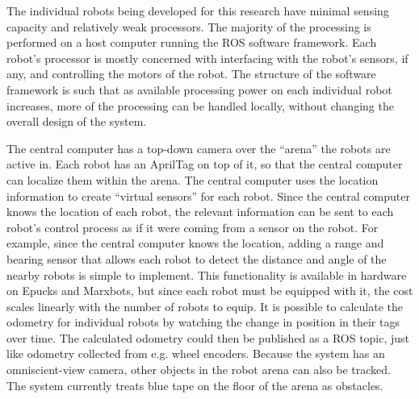 \documentclass[]{article}
\begin{document}
The individual robots being developed for this research have minimal sensing capacity and relatively weak processors. 
The majority of the processing is performed on a host computer running the ROS software framework. 
Each robot's processor is mostly concerned with interfacing with the robot's sensors, if any, and controlling the motors of the robot. 
The structure of the software framework is such that as available processing power on each individual robot increases, more of the processing can be handled locally, without changing the overall design of the system.

The central computer has a top-down camera over the ``arena'' the robots are active in. 
Each robot has an AprilTag \cite{olson2011tags} on top of it, so that the central computer can localize them within the arena. 
The central computer uses the location information to create ``virtual sensors'' for each robot. 
Since the central computer knows the location of each robot, the relevant information can be sent to each robot's control process as if it were coming from a sensor on the robot. 
For example, since the central computer knows the location, adding a range and bearing sensor that allows each robot to detect the distance and angle of the nearby robots is simple to implement. 
This functionality is available in hardware on Epucks and Marxbots, but since each robot must be equipped with it, the cost scales linearly with the number of robots to equip.  
It is possible to calculate the odometry for individual robots by watching the change in position in their tags over time. 
The calculated odometry could then be published as a ROS topic, just like odometry collected from e.g. wheel encoders. 
Because the system has an omniscient-view camera, other objects in the robot arena can also be tracked. 
The system currently treats blue tape on the floor of the arena as obstacles.
\end{document}
